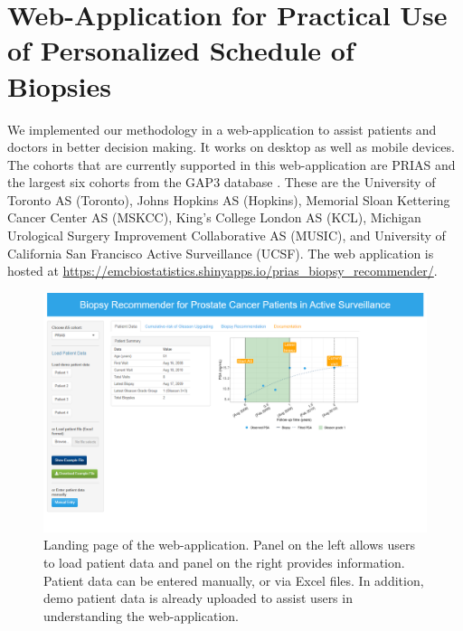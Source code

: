\section{Web-Application for Practical Use of Personalized Schedule of Biopsies}

We implemented our methodology in a web-application to assist patients and doctors in better decision making. It works on desktop as well as mobile devices. The cohorts that are currently supported in this web-application are PRIAS and the largest six cohorts from the GAP3 database \citep{gap3_2018}. These are the University of Toronto AS (Toronto), Johns Hopkins AS (Hopkins), Memorial Sloan Kettering Cancer Center AS (MSKCC), King's College London AS (KCL), Michigan Urological Surgery Improvement Collaborative AS (MUSIC), and University of California San Francisco Active Surveillance (UCSF). The web application is hosted at \url{https://emcbiostatistics.shinyapps.io/prias_biopsy_recommender/}. 

\begin{figure}[!htb]
\centerline{\includegraphics[width=\columnwidth]{images/app/landing_page.png}}
\caption{Landing page of the web-application. Panel on the left allows users to load patient data and panel on the right provides information. Patient data can be entered manually, or via Excel files. In addition, demo patient data is already uploaded to assist users in understanding the web-application.}
\label{fig:landing_page}
\end{figure}